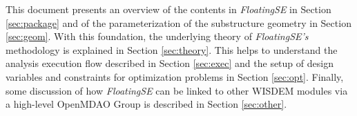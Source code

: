This document presents an overview of the contents in
\textit{FloatingSE} in Section \ref{sec:package} and of the
parameterization of the substructure geometry in Section
\ref{sec:geom}.  With this foundation, the underlying theory of
\textit{FloatingSE's} methodology is explained in Section
\ref{sec:theory}.  This helps to understand the analysis execution flow
described in Section \ref{sec:exec} and the setup of design variables
and constraints for optimization problems in Section \ref{sec:opt}.
Finally, some discussion of how \textit{FloatingSE} can be linked to
other WISDEM modules via a high-level OpenMDAO Group is described in
Section \ref{sec:other}.
